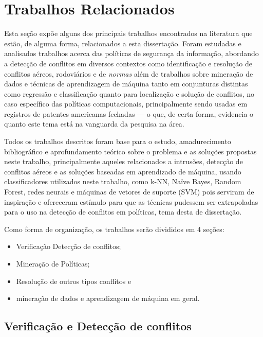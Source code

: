 \section{Trabalhos Relacionados}\label{trabalhos_relacionados}
Esta seção expõe alguns dos principais trabalhos encontrados na literatura que estão, de alguma forma, relacionados a esta dissertação. Foram estudadas e analisados trabalhos acerca das políticas de segurança da informação, abordando a detecção de conflitos em diversos contextos como identificação e resolução de conflitos aéreos, rodoviários e de \textit{normas} além de trabalhos sobre mineração de dados e técnicas de aprendizagem de máquina tanto em conjunturas distintas como regressão e classificação quanto para localização e solução de conflitos, no caso específico das políticas computacionais, principalmente sendo usadas em registros de patentes americanas fechadas --- o que, de certa forma, evidencia o quanto este tema está na vanguarda da pesquisa na área.

Todos os trabalhos descritos foram base para o estudo, amadurecimento bibliográfico e aprofundamento teórico sobre o problema e as soluções propostas neste trabalho, principalmente aqueles relacionados a intrusões, detecção de conflitos aéreos e as soluções baseadas em aprendizado de máquina, usando classificadores utilizados neste trabalho, como k-NN, Naïve Bayes, Random Forest, redes neurais e máquinas de vetores de suporte (SVM) pois serviram de inspiração e ofereceram estímulo para que as técnicas pudessem ser extrapoladas para o uso na detecção de conflitos em políticas, tema desta de dissertação. 

Como forma de organização, os trabalhos serão divididos em 4 seções:\begin{itemize}
	\item Verificação Detecção de conflitos;
	\item Mineração de Políticas;
	\item Resolução de outros tipos conflitos e 
	\item mineração de dados e aprendizagem de máquina em geral.
\end{itemize}

\subsection{Verificação e Detecção de conflitos}\label{sec:deteccao-conflitos}
